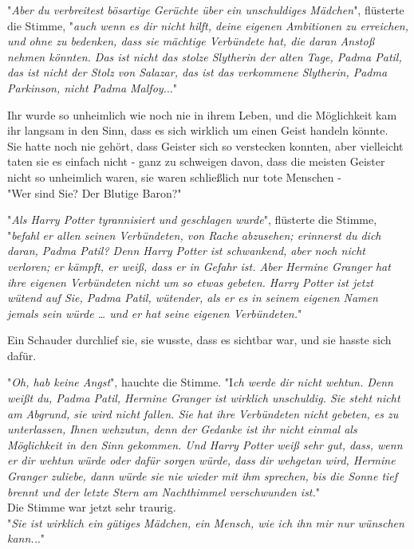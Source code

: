 {"\emph{Aber du verbreitest bösartige Gerüchte über ein unschuldiges Mädchen}", flüsterte die Stimme, "\emph{auch wenn es dir nicht hilft, deine eigenen Ambitionen zu erreichen, und ohne zu bedenken, dass sie mächtige Verbündete hat, die daran Anstoß nehmen könnten. Das ist nicht das stolze Slytherin der alten Tage, Padma Patil, das ist nicht der Stolz von Salazar, das ist das verkommene Slytherin, Padma Parkinson, nicht Padma Malfoy.}.."

Ihr wurde so unheimlich wie noch nie in ihrem Leben, und die Möglichkeit kam ihr langsam in den Sinn, dass es sich wirklich um einen Geist handeln könnte.\\ Sie hatte noch nie gehört, dass Geister sich so verstecken konnten, aber vielleicht taten sie es einfach nicht - ganz zu schweigen davon, dass die meisten Geister nicht so unheimlich waren, sie waren schließlich nur tote Menschen -\\ "Wer sind Sie? Der Blutige Baron?"

"\emph{Als Harry Potter tyrannisiert und geschlagen wurde}", flüsterte die Stimme,\\ "\emph{befahl er allen seinen Verbündeten, von Rache abzusehen; erinnerst du dich daran, Padma Patil? Denn Harry Potter ist schwankend, aber noch nicht verloren; er kämpft, er weiß, dass er in Gefahr ist. Aber Hermine Granger hat ihre eigenen Verbündeten nicht um so etwas gebeten. Harry Potter ist jetzt wütend auf Sie, Padma Patil, wütender, als er es in seinem eigenen Namen jemals sein würde … und er hat seine eigenen Verbündeten.}"

Ein Schauder durchlief sie, sie wusste, dass es sichtbar war, und sie hasste sich dafür.

"\emph{Oh, hab keine Angst}", hauchte die Stimme. "I\emph{ch werde dir nicht wehtun. Denn weißt du, Padma Patil, Hermine Granger ist wirklich unschuldig. Sie steht nicht am Abgrund, sie wird nicht fallen. Sie hat ihre Verbündeten nicht gebeten, es zu unterlassen, Ihnen wehzutun, denn der Gedanke ist ihr nicht einmal als Möglichkeit in den Sinn gekommen. Und Harry Potter weiß sehr gut, dass, wenn er dir wehtun würde oder dafür sorgen würde, dass dir wehgetan wird, Hermine Granger zuliebe, dann würde sie nie wieder mit ihm sprechen, bis die Sonne tief brennt und der letzte Stern am Nachthimmel verschwunden ist.}"\\ Die Stimme war jetzt sehr traurig.\\ "\emph{Sie ist wirklich ein gütiges Mädchen, ein Mensch, wie ich ihn mir nur wünschen kann..}."

}
